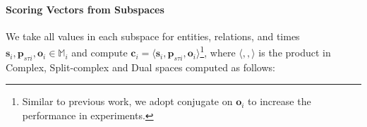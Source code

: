 \documentclass[letterpaper]{article} %
\begin{document}
\paragraph{\textbf{Scoring Vectors from Subspaces}} 
We take all values in each subspace for entities, relations, and times
$\boldsymbol{s}_i, \boldsymbol{p}_{s\tau i}, \boldsymbol{o}_i \in \mathbb{M}_i$ and compute $ \boldsymbol{c}_i =  \langle \boldsymbol{s}_i, \boldsymbol{p}_{s\tau i}, {\boldsymbol{o}_i} \rangle$\footnote{Similar to previous work\cite{xu2020tero,lacroix2019tensor}, we adopt conjugate on $\boldsymbol{o}_i$ to increase the performance in experiments.}, where
$\langle , , \rangle$ is the product in Complex, Split-complex and Dual spaces computed as follows:
\end{document}
